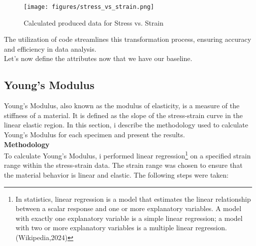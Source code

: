\documentclass{article}
\begin{document}
{ \begin{figure}[H]
	\centering
	\texttt{[image: figures/stress\_vs\_strain.png]}
	\caption{Calculated produced data for Stress vs. Strain}
	\label{fig:stress_strain}
\end{figure}
The utilization of code streamlines this transformation process, ensuring accuracy and efficiency in data analysis.\\[8pt] 
Let's now define the attributes now that we have our baseline.
\newpage
\subsection{Young's Modulus}

Young's Modulus, also known as the modulus of elasticity, is a measure of the stiffness of a material. It is defined as the slope of the stress-strain curve in the linear elastic region. In this section, i describe the methodology used to calculate Young's Modulus for each specimen and present the results.\\[8pt]

\textbf{Methodology}\\[8pt]

To calculate Young's Modulus, i performed linear regression\footnote{In statistics, linear regression is a model that estimates the linear relationship between a scalar response and one or more explanatory variables. A model with exactly one explanatory variable is a simple linear regression; a model with two or more explanatory variables is a multiple linear regression. (Wikipedia,2024)} on a specified strain range within the stress-strain data. The strain range was chosen to ensure that the material behavior is linear and elastic. The following steps were taken:

}
\end{document}
